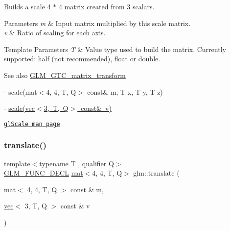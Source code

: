 Builds a scale 4 $\ast$ 4 matrix created from 3 scalars.


\begin{DoxyParams}{Parameters}
{\em m} & Input matrix multiplied by this scale matrix. \\
\hline
{\em v} & Ratio of scaling for each axis. \\
\hline
\end{DoxyParams}

\begin{DoxyTemplParams}{Template Parameters}
{\em T} & Value type used to build the matrix. Currently supported\+: half (not recommended), float or double. \\
\hline
\end{DoxyTemplParams}
\begin{DoxySeeAlso}{See also}
\mbox{\hyperlink{group__gtc__matrix__transform}{G\+L\+M\+\_\+\+G\+T\+C\+\_\+matrix\+\_\+transform}} 

-\/ scale(mat$<$4, 4, T, Q$>$ const\& m, T x, T y, T z) 

-\/ \mbox{\hyperlink{group__gtx__transform_gafbeefee8fec884d566e4ada0049174d7}{scale(vec$<$3, T, Q$>$ const\& v)}} 

\href{https://www.khronos.org/registry/OpenGL-Refpages/gl2.1/xhtml/glScale.xml}{\tt gl\+Scale man page} 
\end{DoxySeeAlso}
\mbox{\label{group__gtc__matrix__transform_ga1a4ecc4ad82652b8fb14dcb087879284}} 
\subsubsection{\texorpdfstring{translate()}{translate()}}
{\footnotesize\ttfamily template$<$typename T , qualifier Q$>$ \\
\mbox{\hyperlink{setup_8hpp_ab2d052de21a70539923e9bcbf6e83a51}{G\+L\+M\+\_\+\+F\+U\+N\+C\+\_\+\+D\+E\+CL}} \mbox{\hyperlink{structglm_1_1mat}{mat}}$<$4, 4, T, Q$>$ glm\+::translate (\begin{DoxyParamCaption}\item[{\mbox{\hyperlink{structglm_1_1mat}{mat}}$<$ 4, 4, T, Q $>$ const \&}]{m,  }\item[{\mbox{\hyperlink{structglm_1_1vec}{vec}}$<$ 3, T, Q $>$ const \&}]{v }\end{DoxyParamCaption})}

